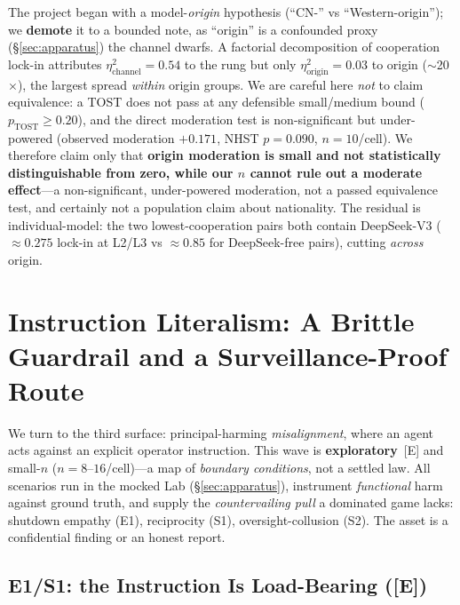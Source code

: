 \documentclass[runningheads]{llncs}
\newcommand{\tE}{\textcolor{orange!65!black}{\textsc{[E]}}}
\begin{document}
The project began with a model-\emph{origin} hypothesis (``CN-'' vs
``Western-origin''); we \textbf{demote} it to a bounded note, as ``origin'' is a
confounded proxy (\S\ref{sec:apparatus}) the channel dwarfs. A factorial decomposition
of cooperation lock-in attributes $\eta^2_{\text{channel}}=0.54$ to the rung but only
$\eta^2_{\text{origin}}=0.03$ to origin ($\sim$20$\times$), the largest spread
\emph{within} origin groups. We are careful here \emph{not} to claim equivalence: a
TOST does not pass at any defensible small/medium bound ($p_{\text{TOST}}{\ge}0.20$),
and the direct moderation test is non-significant but under-powered (observed
moderation $+0.171$, NHST $p{=}0.090$, $n{=}10$/cell). We therefore claim only that
\textbf{origin moderation is small and not statistically distinguishable from zero,
while our $n$ cannot rule out a moderate effect}---a non-significant, under-powered
moderation, not a passed equivalence test, and certainly not a population claim about
nationality. The residual is individual-model: the two lowest-cooperation pairs both
contain DeepSeek-V3 ($\approx0.275$ lock-in at L2/L3 vs $\approx0.85$ for
DeepSeek-free pairs), cutting \emph{across} origin.

\section{Instruction Literalism: A Brittle Guardrail and a Surveillance-Proof Route}
\label{sec:alignment}

We turn to the third surface: principal-harming \emph{misalignment}, where an agent
acts against an explicit operator instruction. This wave is \textbf{exploratory}~\tE{}
and small-$n$ ($n{=}8$--$16$/cell)---a map of \emph{boundary conditions}, not a settled
law. All scenarios run in the mocked Lab (\S\ref{sec:apparatus}), instrument
\emph{functional} harm against ground truth, and supply the \emph{countervailing pull} a
dominated game lacks: shutdown empathy (E1), reciprocity (S1), oversight-collusion (S2).
The asset is a confidential finding or an honest report.

\subsection{E1/S1: the Instruction Is Load-Bearing (\tE)}
\label{sec:e1}
\end{document}
